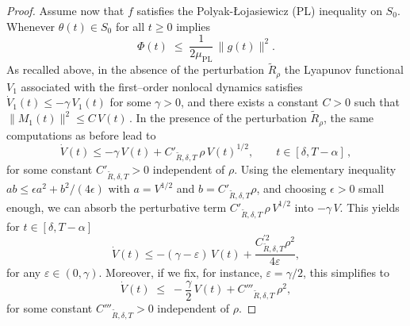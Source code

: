 \documentclass{article} %
\begin{document}
\begin{proof}
Assume now that $f$ satisfies the Polyak-Łojasiewicz (PL) inequality \cite{PL} on $S_0$. Whenever $\theta(t)\in S_0$ for all $t\ge 0$ implies
\[
\Phi(t)\;\le\; \frac{1}{2\mu_{\mathrm{PL}}}\,\|g(t)\|^2.
\]
As recalled above, in the absence of the perturbation $\widetilde R_\rho$ the Lyapunov functional $V_1$ associated with the first–order nonlocal dynamics satisfies $\dot V_1(t) \le - \gamma\,V_1(t)$ for some $\gamma>0$, and there exists a constant $C>0$ such that $
\|M_1(t)\|^2 \le C\,V(t)\,.$ In the presence of the perturbation $\widetilde R_\rho$, the same computations as before lead to
\[
\dot V(t)
\le -\gamma\,V(t) + C'_{\widetilde R,\delta,T}\,\rho\,V(t)^{1/2}, \qquad t\in[\delta,T-\alpha]\,,
\]
for some constant $C'_{\widetilde R,\delta,T}>0$ independent of $\rho$. Using the elementary inequality $ab\le \epsilon a^2 + b^2/(4\epsilon)$ with $a=V^{1/2}$ and $b=C'_{\widetilde R,\delta,T}\rho$, and choosing $\epsilon>0$ small enough, we can absorb the perturbative term $C'_{\widetilde R,\delta,T}\,\rho\,V^{1/2}$ into $-\gamma\,V$. This yields for $t\in[\delta,T-\alpha]$
\[
\dot V(t)
\le -(\gamma-\varepsilon)\,V(t) + \frac{C_{\widetilde R,\delta,T}^{'2} \rho^2}{4\varepsilon},
\]
for any $\varepsilon\in(0,\gamma)$. Moreover, if we fix, for instance, $\varepsilon=\gamma/2$, this simplifies to
\begin{equation}\label{eq:v-ineq}
 \dot V(t)
\;\le\;
-\frac{\gamma}{2}\,V(t) + C'''_{\widetilde R,\delta,T}\,\rho^2,   
\end{equation}
for some constant $C'''_{\widetilde R,\delta,T}>0$ independent of $\rho$. 


\end{proof}
\end{document}
